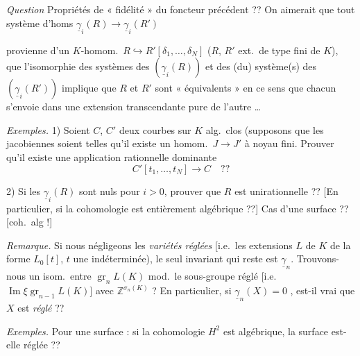\documentclass[11pt,a4paper]{article}
\begin{document}
\emph{Question}  Propriétés de « fidélité »  du foncteur précédent ?? On aimerait que tout \struck{\ill{}} système d'homs $\underline{\gamma}_{i}(R) \to \underline{\gamma}_{i}(R')$

provienne d'un $K$-homom.\ $R \hookrightarrow R'[\delta_{1}, \ldots, \delta_{N}]$ ($R$, $R'$ ext.\ de type fini de $K$), que l'isomorphie des systèmes des $(\underline{\gamma}_{i}(R))$ et des (du) système(s) des $(\underline{\gamma}_{i}(R'))$ implique que $R$ et $R'$ sont « équivalents » en ce sens que chacun s'envoie dans une extension transcendante pure de l'autre \ldots

\emph{Exemples.} 1) Soient $C$, $C'$ deux courbes  sur $K$ alg.\ clos (supposons que les jacobiennes soient telles qu'il existe un homom.\ $J \to J'$ à noyau fini. Prouver qu'il existe  une application rationnelle dominante
\[
  C'[t_{1}, \ldots, t_{N}] \longrightarrow C \quad ??
\]

2) Si les $\underline{\gamma}_{i}(R)$ sont nuls pour $i > 0$, prouver que $R$ est unirationnelle ?? [En particulier, si la cohomologie  est entièrement algébrique ??] Cas d'une surface ?? [coh.\ alg !]

\emph{Remarque.} Si nous négligeons les \emph{variétés réglées}  [i.e.\ les extensions $L$ de $K$  de la forme $L_{0}[t]$, $t$ une indéterminée), le seul invariant  qui reste est $\underline{\gamma}_{n}$. Trouvons-nous un isom.\ entre $\operatorname{gr}_{n} L(K)$ mod.\ le sous-groupe réglé [i.e.\ $\operatorname{Im} \xi \operatorname{gr}_{n-1} L(K)$] avec $\mathbb{Z}^{\sigma_{n}(K)}$ ? En particulier, si $\underline{\gamma}_{n}(X) = 0$ \struck{\ill{}}, est-il vrai que $X$ est \emph{réglé} ??

\emph{Exemples.} Pour une surface : si la cohomologie $H^{2}$ est algébrique, la surface est-elle réglée ??
\end{document}
